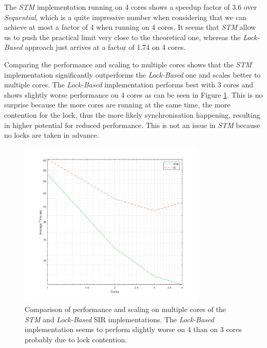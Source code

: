 The \textit{STM} implementation running on 4 cores shows a speedup factor of 3.6 over \textit{Sequential}, which is a quite impressive number when considering that we can achieve at most a factor of 4 when running on 4 cores. It seems that \textit{STM} allow us to push the practical limit very close to the theoretical one, whereas the \textit{Lock-Based} approach just arrives at a factor of 1.74 on 4 cores.

Comparing the performance and scaling to multiple cores shows that the \textit{STM} implementation significantly outperforms the \textit{Lock-Based} one and scales better to multiple cores. The \textit{Lock-Based} implementation performs best with 3 cores and shows slightly worse performance on 4 cores as can be seen in Figure \ref{fig:core_duration_stm_io}. This is no surprise because the more cores are running at the same time, the more contention for the lock, thus the more likely synchronisation happening, resulting in higher potential for reduced performance. This is not an issue in \textit{STM} because no locks are taken in advance. 

\begin{figure}
	\centering
	\includegraphics[width=0.8\textwidth, angle=0]{./fig/concurrentabs/sir/core_duration_stm_io.png}
	\caption[Comparison of performance and scaling on multiple cores of the \textit{STM} and \textit{Lock-Based} SIR implementations]{Comparison of performance and scaling on multiple cores of the \textit{STM} and \textit{Lock-Based} SIR implementations. The \textit{Lock-Based} implementation seems to perform slightly worse on 4 than on 3 cores probably due to lock contention.}
	\label{fig:core_duration_stm_io}
\end{figure}

